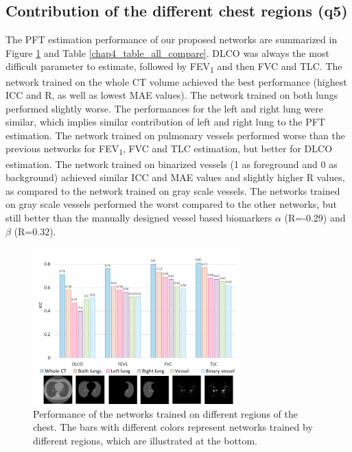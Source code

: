 \subsection{Contribution of the different chest regions (q5)}
The PFT estimation performance of our proposed networks are summarized in Figure \ref{fig:chap4_bar} and Table \ref{chap4_table_all_compare}. DLCO was always the most difficult parameter to estimate, followed by FEV\textsubscript{1} and then FVC and TLC. The network trained on the whole CT volume achieved the best performance (highest ICC and R, as well as lowest MAE values). The network trained on both lungs performed slightly worse. The performances for the left and right lung were similar, which implies similar contribution of left and right lung to the PFT estimation. The network trained on pulmonary vessels performed worse than the previous networks for FEV\textsubscript{1}, FVC and TLC estimation, but better for DLCO estimation. The network trained on binarized vessels (1 as foreground and 0 as background) achieved similar ICC and MAE values and slightly higher R values, as compared to the network trained on gray scale vessels. The networks trained on gray scale vessels performed the worst compared to the other networks, but still better than the manually designed vessel based biomarkers $\alpha$ (R=-0.29) and $\beta$ (R=0.32).

\begin{figure}[tb]
    \centering
    \includegraphics[width=8cm]{bar.png}
    \caption{Performance of the networks trained on different regions of the chest. The bars with different colors represent networks trained by different regions, which are illustrated at the bottom.}
    \label{fig:chap4_bar}
\end{figure}


